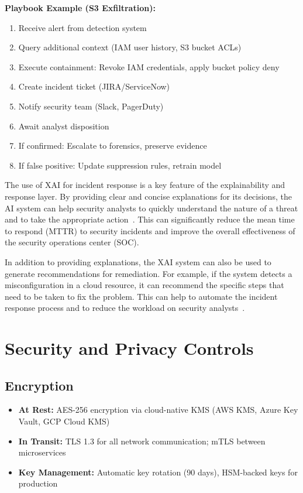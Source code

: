 \textbf{Playbook Example (S3 Exfiltration):}
\begin{enumerate}
    \item Receive alert from detection system
    \item Query additional context (IAM user history, S3 bucket ACLs)
    \item Execute containment: Revoke IAM credentials, apply bucket policy deny
    \item Create incident ticket (JIRA/ServiceNow)
    \item Notify security team (Slack, PagerDuty)
    \item Await analyst disposition
    \item If confirmed: Escalate to forensics, preserve evidence
    \item If false positive: Update suppression rules, retrain model
\end{enumerate}

The use of XAI for incident response is a key feature of the explainability and response layer. By providing clear and concise explanations for its decisions, the AI system can help security analysts to quickly understand the nature of a threat and to take the appropriate action~\cite{aithority2024xai}. This can significantly reduce the mean time to respond (MTTR) to security incidents and improve the overall effectiveness of the security operations center (SOC).

In addition to providing explanations, the XAI system can also be used to generate recommendations for remediation. For example, if the system detects a misconfiguration in a cloud resource, it can recommend the specific steps that need to be taken to fix the problem. This can help to automate the incident response process and to reduce the workload on security analysts~\cite{rocheston2024incident}.

\section{Security and Privacy Controls}\label{sec:arch-security}
\subsection{Encryption}
\begin{itemize}
    \item \textbf{At Rest:} AES-256 encryption via cloud-native KMS (AWS KMS, Azure Key Vault, GCP Cloud KMS)
    \item \textbf{In Transit:} TLS 1.3 for all network communication; mTLS between microservices
    \item \textbf{Key Management:} Automatic key rotation (90 days), HSM-backed keys for production
\end{itemize}

